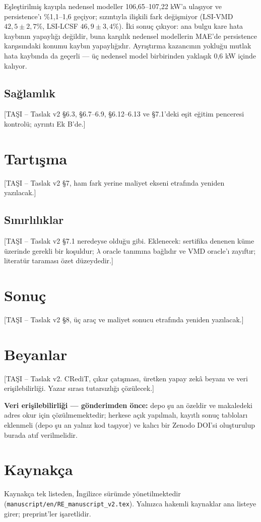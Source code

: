 \documentclass[11pt,a4paper]{article}
\newcommand{\tasi}[1]{\textsf{\small [TAŞI -- #1]}}
\begin{document}
Eşleştirilmiş kayıpla nedensel modeller 106,65--107,22 kW'a ulaşıyor ve
persistence'ı \%1,1--1,6 geçiyor; sızıntıyla ilişkili fark değişmiyor
(LSI-VMD $42,5\pm2,7$\%, LSI-LCSF $46,9\pm3,4$\%). İki sonuç çıkıyor: ana bulgu
kare hata kaybının yapaylığı değildir, buna karşılık nedensel modellerin MAE'de
persistence karşısındaki konumu kaybın yapaylığıdır. Ayrıştırma kazancının
yokluğu mutlak hata kaybında da geçerli --- üç nedensel model birbirinden
yaklaşık 0,6 kW içinde kalıyor.

\subsection{Sağlamlık}
\tasi{Taslak v2 §6.3, §6.7--6.9, §6.12--6.13 ve §7.1'deki eşit eğitim penceresi
kontrolü; ayrıntı Ek B'de.}

\section{Tartışma}
\tasi{Taslak v2 §7, ham fark yerine maliyet ekseni etrafında yeniden
yazılacak.}

\subsection{Sınırlılıklar}
\tasi{Taslak v2 §7.1 neredeyse olduğu gibi. Eklenecek: sertifika denenen küme
üzerinde gerekli bir koşuldur; $\lambda$ oracle tanımına bağlıdır ve VMD
oracle'ı zayıftır; literatür taraması özet düzeydedir.}

\section{Sonuç}
\tasi{Taslak v2 §8, üç araç ve maliyet sonucu etrafında yeniden yazılacak.}

\section*{Beyanlar}
\tasi{Taslak v2. CRediT, çıkar çatışması, üretken yapay zekâ beyanı ve veri
erişilebilirliği. Yazar sırası tutarsızlığı çözülecek.}

\textbf{Veri erişilebilirliği --- gönderimden önce:} depo şu an özeldir ve
makaledeki adres okur için çözülmemektedir; herkese açık yapılmalı, kayıtlı
sonuç tabloları eklenmeli (depo şu an yalnız kod taşıyor) ve kalıcı bir Zenodo
DOI'si oluşturulup burada atıf verilmelidir.

\section*{Kaynakça}
\textsf{Kaynakça tek listeden, İngilizce sürümde yönetilmektedir
(\texttt{manuscript/en/RE\_manuscript\_v2.tex}). Yalnızca hakemli kaynaklar ana
listeye girer; preprint'ler işaretlidir.}
\end{document}
